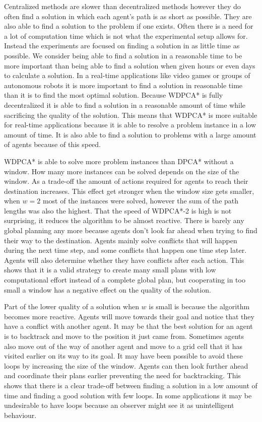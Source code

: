 Centralized methods are slower than decentralized methods however they do often
find a solution in which each agent's path is as short as possible. They are
also able to find a solution to the problem if one exists. Often there is a
need for a lot of computation time which is not what the experimental setup
allows for. Instead the experiments are focused on finding a solution in as
little time as possible. We consider being able to find a solution in
a reasonable time to be more important than being able to find a solution when
given hours or even days to calculate a solution. In a real-time applications
like video games or groups of autonomous robots it is more important to find a
solution in reasonable time than it is to find the most optimal solution.
Because WDPCA* is fully decentralized it is able to find a solution in a
reasonable amount of time while sacrificing the quality of the solution. This
means that WDPCA* is more suitable for real-time applications because it is
able to resolve a problem instance in a low amount of time. It is also able to
find a solution to problems with a large amount of agents because of this speed.

WDPCA* is able to solve more problem instances than DPCA* without a window. How
many more instances can be solved depends on the size of the window. As a
trade-off the amount of actions required for agents to reach their destination
increases. This effect get stronger when the window size gets smaller, when
$w=2$ most of the instances were solved, however the sum of the path lengths
was also the highest. That the speed of WDPCA*-2 is high is not surprising, it
reduces the algorithm to be almost reactive. There is barely any global
planning any more because agents don't look far ahead when trying to find their
way to the destination. Agents mainly solve conflicts that will
happen during the next time step, and some conflicts that happen one time step
later. Agents will also determine whether they have conflicts after each action.
This shows that it is a valid strategy to create many small plans with
low computational effort instead of a complete global plan, but cooperating in
too small a window has a negative effect on the quality of the solution.

Part of the lower quality of a solution when $w$ is small is because the
algorithm becomes more reactive. Agents will move towards their goal and notice
that they have a conflict with another agent. It may be that the best solution
for an agent is to backtrack and move to the position it just came from.
Sometimes agents also move out of the way of another agent and move to a grid
cell that it has visited earlier on its way to its goal. It may have been
possible to avoid these loops by increasing the size of the window. Agents can
then look further ahead and coordinate their plans earlier preventing the need
for backtracking. This shows that there is a clear trade-off between finding a
solution in a low amount of time and finding a good solution with few loops. In
some applications it may be undesirable to have loops because an observer might
see it as unintelligent behaviour.

